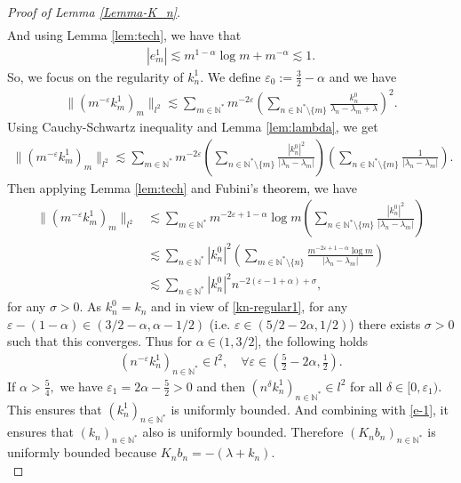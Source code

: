 \documentclass[10pt,a4paper]{amsart}
\begin{document}
\begin{proof}[Proof of Lemma \ref{Lemma-K_n}]
\begin{align*}
\end{align*}
And using Lemma \ref{lem:tech}, we have that
\begin{align}
    |e_m^1|\lesssim m^{1-\alpha}\log m+m^{-\alpha}\lesssim 1.\label{e-1}
\end{align} So, we focus on the regularity of $k_n^1.$ We define $\varepsilon_0:=\frac{3}{2}-\alpha$ and we have
\begin{align*}
    \|(m^{-\varepsilon} k_m^1)_m\|_{l^2}\lesssim \sum_{m\in \mathbb{N}^*}m^{-2\varepsilon}\left(\sum_{n\in \mathbb{N}^*\setminus\{m\}}\frac{k_n^0}{\lambda_n-\lambda_m+\lambda}\right)^2.
\end{align*}
Using Cauchy-Schwartz inequality and Lemma \ref{lem:lambda}, we get
\begin{align*}
    \|(m^{-\varepsilon} k_m^1)_m\|_{l^2}\lesssim \sum_{m\in \mathbb{N}^*}m^{-2\varepsilon}\left(\sum_{n\in \mathbb{N}^*\setminus\{m\}}\frac{|k_n^0|^2}{|\lambda_n-\lambda_m|}\right)\left(\sum_{n\in \mathbb{N}^*\setminus\{m\}}\frac{1}{|\lambda_n-\lambda_m|}\right).
\end{align*}
Then applying Lemma \eqref{lem:tech} and Fubini's \textcolor{black}{theorem}, we have
\begin{align*}
    \|(m^{-\varepsilon} k_m^1)_m\|_{l^2}&\lesssim \sum_{m\in \mathbb{N}^*}m^{-2\varepsilon+1-\alpha}\log m\left(\sum_{n\in \mathbb{N}^*\setminus\{m\}}\frac{|k_n^0|^2}{|\lambda_n-\lambda_m|}\right)\\
    &\lesssim \sum_{n\in \mathbb{N}^*}|k_n^0|^2\left(\sum_{m\in \mathbb{N}^*\setminus\{n\}}\frac{m^{-2\varepsilon+1-\alpha}\log m}{|\lambda_n-\lambda_m|}\right)\\
    &\lesssim \sum_{n\in \mathbb{N}^*}|k_n^0|^2n^{-2(\varepsilon-1+\alpha)+\sigma},
\end{align*} 
for any $\sigma>0$. As $k_n^0=k_n$ and in view of \eqref{kn-regular1}, for any $\varepsilon-(1-\alpha)\in \left(3/2-\alpha,\alpha-1/2\right)$ (i.e. $\varepsilon\in \left(5/2-2\alpha,1/2\right)$) there exists $\sigma>0$ such that this converges. Thus for $\alpha\in (1,3/2]$, the following holds
\begin{align}
    (n^{-\varepsilon} k_n^1)_{n\in \mathbb{N}^*}\in l^2, \quad \forall \varepsilon\in \left(\frac{5}{2}-2\alpha,\frac{1}{2}\right).\label{kn1-l2}
\end{align}
If $\alpha>\frac{5}{4},$ we have $\varepsilon_1=2\alpha-\frac{5}{2}>0$ and then $(n^{\delta} k_n^1)_{n\in \mathbb{N}^*}\in l^2$ for all $\delta\in[0,\varepsilon_1).$ This ensures that $(k_n^1)_{n\in \mathbb{N}^*}$ is uniformly bounded. And combining with \eqref{e-1}, it ensures that $(k_n)_{n\in \mathbb{N}^*}$ also is uniformly bounded. Therefore $(K_n b_n)_{n\in \mathbb{N}^*}$ is uniformly bounded because $K_n b_n=-(\lambda+k_n).$ \\

\end{proof}
\end{document}
